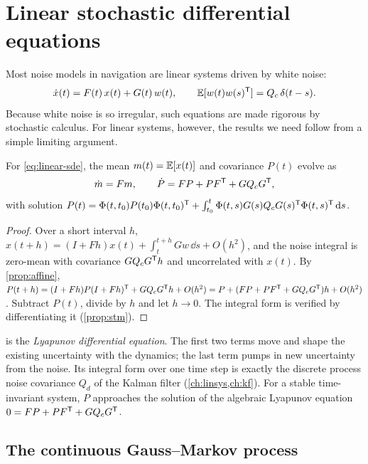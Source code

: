 \section{Linear stochastic differential equations}
\label{sec:lyapunov}

Most noise models in navigation are linear systems driven by white noise:
\begin{equation}
  \dot x(t) = F(t)\,x(t) + G(t)\,w(t), \qquad \mathbb{E}[w(t)w(s)^{\mathsf{T}}] = Q_c\,\delta(t - s).
  \label{eq:linear-sde}
\end{equation}
Because white noise is so irregular, such equations are made rigorous by stochastic calculus. For linear systems, however, the results we
need follow from a simple limiting argument.

\begin{proposition}
\label{prop:lyapunov}
For \eqref{eq:linear-sde}, the mean $m(t) = \mathbb{E}[x(t)]$ and covariance $P(t)$ evolve as
\begin{equation}
  \dot m = Fm, \qquad \dot P = FP + PF^{\mathsf{T}} + GQ_cG^{\mathsf{T}},
  \label{eq:lyapunov-ode}
\end{equation}
with solution $P(t) = \Phi(t, t_0)P(t_0)\Phi(t, t_0)^{\mathsf{T}} + \int_{t_0}^t\Phi(t, s)G(s)Q_cG(s)^{\mathsf{T}}\Phi(t, s)^{\mathsf{T}}\,\mathrm{d} s$.
\end{proposition}
\begin{proof}
Over a short interval $h$, $x(t + h) = (I + Fh)x(t) + \int_t^{t+h}Gw\,\dd s + O(h^2)$, and the noise integral is zero-mean with covariance $GQ_cG^{\mathsf{T}} h$ and
uncorrelated with $x(t)$. By \cref{prop:affine}, $P(t + h) = (I + Fh)P(I + Fh)^{\mathsf{T}} + GQ_cG^{\mathsf{T}} h + O(h^2) = P + (FP + PF^{\mathsf{T}} + GQ_cG^{\mathsf{T}})h + O(h^2)$. Subtract
$P(t)$, divide by $h$ and let $h\to0$. The integral form is verified by differentiating it (\cref{prop:stm}).
\end{proof}

 is the \emph{Lyapunov differential equation}. The first two terms move and shape the existing uncertainty with the
dynamics; the last term pumps in new uncertainty from the noise. Its integral form over one time step is exactly the discrete process noise
covariance $Q_d$ of the Kalman filter (\cref{ch:linsys,ch:kf}). For a stable time-invariant system, $P$ approaches the solution of the
algebraic Lyapunov equation $0 = FP + PF^{\mathsf{T}} + GQ_cG^{\mathsf{T}}$.

\subsection{The continuous Gauss--Markov process}

